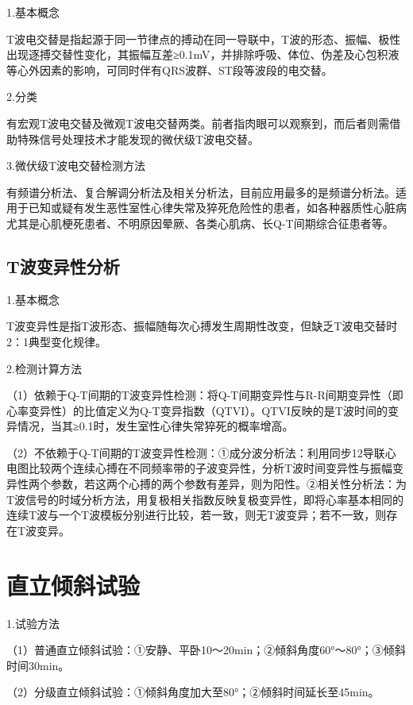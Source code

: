1.基本概念

T波电交替是指起源于同一节律点的搏动在同一导联中，T波的形态、振幅、极性出现逐搏交替性变化，其振幅互差≥0.1mV，并排除呼吸、体位、伪差及心包积液等心外因素的影响，可同时伴有QRS波群、ST段等波段的电交替。

2.分类

有宏观T波电交替及微观T波电交替两类。前者指肉眼可以观察到，而后者则需借助特殊信号处理技术才能发现的微伏级T波电交替。

3.微伏级T波电交替检测方法

有频谱分析法、复合解调分析法及相关分析法，目前应用最多的是频谱分析法。适用于已知或疑有发生恶性室性心律失常及猝死危险性的患者，如各种器质性心脏病尤其是心肌梗死患者、不明原因晕厥、各类心肌病、长Q-T间期综合征患者等。

\protect\hypertarget{text00056.htmlux5cux23subid667}{}{}

\subsection{T波变异性分析}

1.基本概念

T波变异性是指T波形态、振幅随每次心搏发生周期性改变，但缺乏T波电交替时2：1典型变化规律。

2.检测计算方法

（1）依赖于Q-T间期的T波变异性检测：将Q-T间期变异性与R-R间期变异性（即心率变异性）的比值定义为Q-T变异指数（QTVI）。QTVI反映的是T波时间的变异情况，当其≥0.1时，发生室性心律失常猝死的概率增高。

（2）不依赖于Q-T间期的T波变异性检测：①成分波分析法：利用同步12导联心电图比较两个连续心搏在不同频率带的子波变异性，分析T波时间变异性与振幅变异性两个参数，若这两个心搏的两个参数有差异，则为阳性。②相关性分析法：为T波信号的时域分析方法，用复极相关指数反映复极变异性，即将心率基本相同的连续T波与一个T波模板分别进行比较，若一致，则无T波变异；若不一致，则存在T波变异。

\protect\hypertarget{text00056.htmlux5cux23subid668}{}{}

\section{直立倾斜试验}

1.试验方法

（1）普通直立倾斜试验：①安静、平卧10～20min；②倾斜角度60°～80°；③倾斜时间30min。

（2）分级直立倾斜试验：①倾斜角度加大至80°；②倾斜时间延长至45min。

